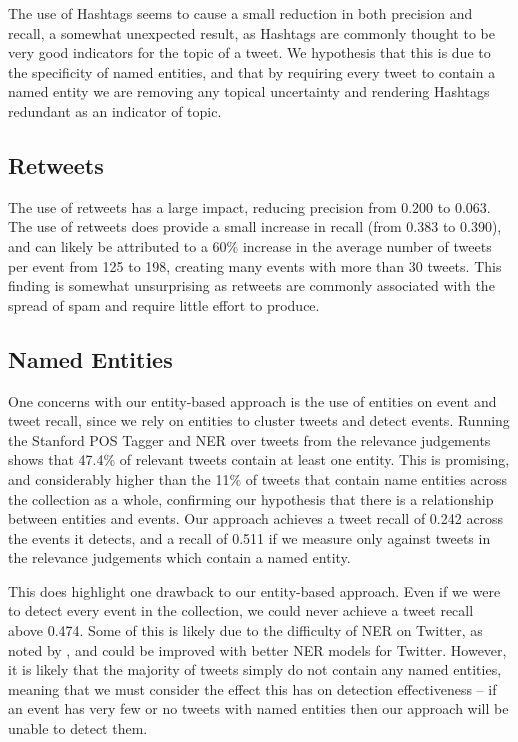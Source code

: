The use of Hashtags seems to cause a small reduction in both precision and recall, a somewhat unexpected result, as Hashtags are commonly thought to be very good indicators for the topic of a tweet.
We hypothesis that this is due to the specificity of named entities, and that by requiring every tweet to contain a named entity we are removing any topical uncertainty and rendering Hashtags redundant as an indicator of topic.

\subsection{Retweets}
\label{detection:sec:retweetsEval}
The use of retweets has a large impact, reducing precision from 0.200 to 0.063. The use of retweets does provide a small increase in recall (from 0.383 to 0.390), and can likely be attributed to a 60\% increase in the average number of tweets per event from 125 to 198, creating many events with more than 30 tweets. This finding is somewhat unsurprising as retweets are commonly  associated with the spread of spam and require little effort to produce.

\subsection{Named Entities}
\label{detection:sec:entitiesEval}
One concerns with our entity-based approach is the use of entities on event and tweet recall, since we rely on entities to cluster tweets and detect events.
Running the Stanford POS Tagger and NER over tweets from the relevance judgements shows that 47.4\% of relevant tweets contain at least one entity. This is promising, and considerably higher than the 11\% of tweets that contain name entities across the collection as a whole, confirming our hypothesis that there is a relationship between entities and events.
Our approach achieves a tweet recall of 0.242 across the events it detects, and a recall of 0.511 if we measure only against tweets in the relevance judgements which contain a named entity.

This does highlight one drawback to our entity-based approach.
Even if we were to detect every event in the collection, we could never achieve a tweet recall above 0.474.
Some of this is likely due to the difficulty of NER on Twitter, as noted by \cite{DBLP:conf/sigir/LiWHYDSL12}, and could be improved with better NER models for Twitter. However, it is likely that the majority of tweets simply do not contain any named entities, meaning that we must consider the effect this has on detection effectiveness -- if an event has very few or no tweets with named entities then our approach will be unable to detect them.

